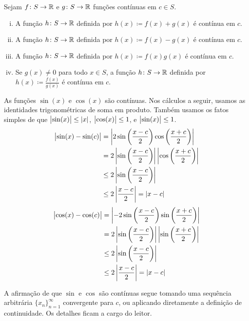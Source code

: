 \begin{prop} \label{contalg:prop}
Sejam $f \colon S \to {\mathbb{R}}$ e $g \colon S \to {\mathbb{R}}$ funções
contínuas em $c \in S$.
\begin{enumerate}[(i)]
\item A função $h \colon S \to {\mathbb{R}}$ definida por
$h(x) \coloneqq f(x)+g(x)$ é contínua em $c$.
\item A função $h \colon S \to {\mathbb{R}}$ definida por
$h(x) \coloneqq f(x)-g(x)$ é contínua em $c$.
\item A função $h \colon S \to {\mathbb{R}}$ definida por
$h(x) \coloneqq f(x)g(x)$ é contínua em $c$.
\item Se $g(x) \neq 0$ para todo $x \in S$, a função $h \colon S \to {\mathbb{R}}$
definida por $h(x) \coloneqq \frac{f(x)}{g(x)}$ é contínua em $c$.
\end{enumerate}
\end{prop}

\begin{example} \label{sincos:example}
As funções $\sin(x)$ e $\cos(x)$ são contínuas.
Nos cálculos a seguir, usamos as identidades trigonométricas de soma em produto.
Também usamos os fatos simples de que
$\bigl\lvert {\sin(x)} \bigr\rvert \leq \lvert {x} \rvert$, $\bigl\lvert {\cos(x)} \bigr\rvert \leq 1$,
e $\bigl\lvert {\sin(x)} \bigr\rvert \leq 1$.
\begin{equation*}
\begin{split}
\bigl\lvert {\sin(x)-\sin(c)} \bigr\rvert & =
\left\lvert {
2 \sin \left( \frac{x-c}{2} \right) \cos \left( \frac{x+c}{2} \right)
} \right\rvert
\\
& =
2
\left\lvert { \sin \left( \frac{x-c}{2} \right) } \right\rvert
\left\lvert { \cos \left( \frac{x+c}{2} \right) } \right\rvert
\\
& \leq
2
\left\lvert { \sin \left( \frac{x-c}{2} \right) } \right\rvert
\\
& \leq
2
\left\lvert { \frac{x-c}{2} } \right\rvert
= \lvert {x-c} \rvert
\end{split}
\end{equation*}
\begin{equation*}
\begin{split}
\bigl\lvert {\cos(x)-\cos(c)} \bigr\rvert & =
\left\lvert {
-2 \sin \left( \frac{x-c}{2} \right) \sin \left( \frac{x+c}{2} \right)
} \right\rvert
\\
& =
2
\left\lvert { \sin \left( \frac{x-c}{2} \right) } \right\rvert
\left\lvert { \sin \left( \frac{x+c}{2} \right) } \right\rvert
\\
& \leq
2
\left\lvert { \sin \left( \frac{x-c}{2} \right) } \right\rvert
\\
& \leq
2
\left\lvert { \frac{x-c}{2} } \right\rvert
= \lvert {x-c} \rvert
\end{split}
\end{equation*}

A afirmação de que $\sin$ e $\cos$ são contínuas segue tomando uma
sequência arbitrária $\{ x_n \}_{n=1}^\infty$ convergente para $c$, ou aplicando diretamente a
definição de continuidade. Os detalhes ficam a cargo do
leitor.
\end{example}

